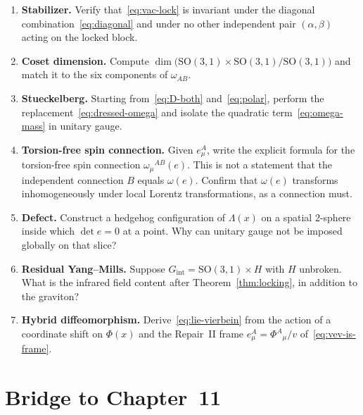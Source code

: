 \begin{enumerate}
  \item \textbf{Stabilizer.}
    Verify that~\eqref{eq:vac-lock} is invariant under the
    diagonal combination~\eqref{eq:diagonal} and under no other
    independent pair \((\alpha,\beta)\) acting on the locked block.
  \item \textbf{Coset dimension.}
    Compute
    \(\dim\bigl(\mathrm{SO}(3,1)\times\mathrm{SO}(3,1)
    /\mathrm{SO}(3,1)\bigr)\) and match it to the six components
    of \(\omega_{AB}\).
  \item \textbf{Stueckelberg.}
    Starting from~\eqref{eq:D-both} and~\eqref{eq:polar}, perform
    the replacement~\eqref{eq:dressed-omega} and isolate the
    quadratic term~\eqref{eq:omega-mass} in unitary gauge.
  \item \textbf{Torsion-free spin connection.}
    Given \(e^A_\mu\), write the explicit formula for the
    torsion-free spin connection
    \(\omega_\mu{}^{AB}(e)\). This is not a statement that the
    independent connection \(B\) equals \(\omega(e)\).
    Confirm that \(\omega(e)\) transforms inhomogeneously under local
    Lorentz transformations, as a connection must.
  \item \textbf{Defect.}
    Construct a hedgehog configuration of \(\Lambda(x)\) on a
    spatial 2-sphere inside which \(\det e=0\) at a point. Why
    can unitary gauge not be imposed globally on that slice?
  \item \textbf{Residual Yang--Mills.}
    Suppose \(G_{\mathrm{int}}=\mathrm{SO}(3,1)\times H\) with
    \(H\) unbroken. What is the infrared field content after
    Theorem~\ref{thm:locking}, in addition to the graviton?
  \item \textbf{Hybrid diffeomorphism.}
    Derive~\eqref{eq:lie-vierbein} from the action of a
    coordinate shift on \(\Phi(x)\) and the Repair~II frame
    \(e^A_\mu=\Phi^A{}_\mu/v\) of~\eqref{eq:vev-is-frame}.
\end{enumerate}

\section{Bridge to Chapter~11}
\label{sec:ch10-bridge}

